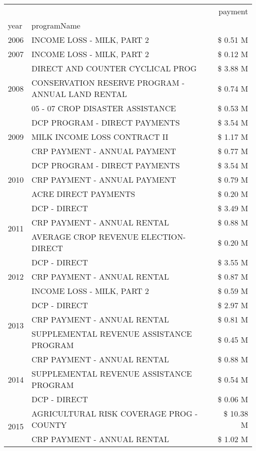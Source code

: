 \begin{tabular}{llr}
\toprule
 &  & payment \\
year & programName &  \\
\midrule
2006 & INCOME LOSS - MILK, PART 2 & \$ 0.51 M \\
\cline{1-3}
2007 & INCOME LOSS - MILK, PART 2 & \$ 0.12 M \\
\cline{1-3}
\multirow[t]{3}{*}{2008} & DIRECT AND COUNTER CYCLICAL PROG & \$ 3.88 M \\
 & CONSERVATION RESERVE PROGRAM - ANNUAL LAND RENTAL & \$ 0.74 M \\
 & 05 - 07 CROP DISASTER ASSISTANCE & \$ 0.53 M \\
\cline{1-3}
\multirow[t]{3}{*}{2009} & DCP PROGRAM - DIRECT PAYMENTS & \$ 3.54 M \\
 & MILK INCOME LOSS CONTRACT II & \$ 1.17 M \\
 & CRP PAYMENT - ANNUAL PAYMENT & \$ 0.77 M \\
\cline{1-3}
\multirow[t]{3}{*}{2010} & DCP PROGRAM - DIRECT PAYMENTS & \$ 3.54 M \\
 & CRP PAYMENT - ANNUAL PAYMENT & \$ 0.79 M \\
 & ACRE DIRECT PAYMENTS & \$ 0.20 M \\
\cline{1-3}
\multirow[t]{3}{*}{2011} & DCP - DIRECT & \$ 3.49 M \\
 & CRP PAYMENT - ANNUAL RENTAL & \$ 0.88 M \\
 & AVERAGE CROP REVENUE ELECTION-DIRECT & \$ 0.20 M \\
\cline{1-3}
\multirow[t]{3}{*}{2012} & DCP - DIRECT & \$ 3.55 M \\
 & CRP PAYMENT - ANNUAL RENTAL & \$ 0.87 M \\
 & INCOME LOSS - MILK, PART 2 & \$ 0.59 M \\
\cline{1-3}
\multirow[t]{3}{*}{2013} & DCP - DIRECT & \$ 2.97 M \\
 & CRP PAYMENT - ANNUAL RENTAL & \$ 0.81 M \\
 & SUPPLEMENTAL REVENUE ASSISTANCE PROGRAM & \$ 0.45 M \\
\cline{1-3}
\multirow[t]{3}{*}{2014} & CRP PAYMENT - ANNUAL RENTAL & \$ 0.88 M \\
 & SUPPLEMENTAL REVENUE ASSISTANCE PROGRAM & \$ 0.54 M \\
 & DCP - DIRECT & \$ 0.06 M \\
\cline{1-3}
\multirow[t]{3}{*}{2015} & AGRICULTURAL RISK COVERAGE PROG - COUNTY & \$ 10.38 M \\
 & CRP PAYMENT - ANNUAL RENTAL & \$ 1.02 M \\

\end{tabular}
